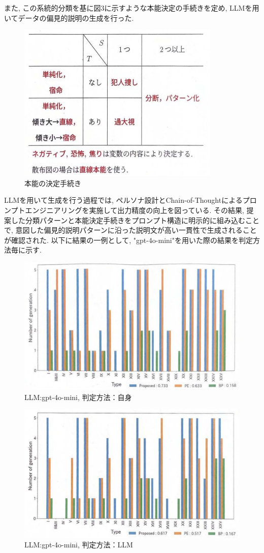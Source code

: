 \documentclass[dvipdfmx]{jsarticle}
\begin{document}
また, この系統的分類を基に図3に示すような本能決定の手続きを定め, LLMを用いてデータの偏見的説明の生成を行った.

\begin{figure}[H]
  \centering
  \includegraphics[width=0.6\linewidth]{03.png}
  \caption{本能の決定手続き}
  \label{fig:instinct-flow}
\end{figure}


LLMを用いて生成を行う過程では, ペルソナ設計とChain-of-Thoughtによるプロンプトエンジニアリングを実施して出力精度の向上を図っている.
\vspace{1em}
その結果, 提案した分類パターンと本能決定手続きをプロンプト構造に明示的に組み込むことで, 意図した偏見的説明パターンに沿った説明文が高い一貫性で生成されることが確認された. 以下に結果の一例として, "gpt-4o-mini"を用いた際の結果を判定方法毎に示す.

\begin{figure}[H]
  \centering
  \includegraphics[width=0.6\linewidth]{04.png}
  \caption{LLM:gpt-4o-mini, 判定方法：自身}
  \label{fig:pattern4}
\end{figure}

\begin{figure}[H]
  \centering
  \includegraphics[width=0.6\linewidth]{05.png}
  \caption{LLM:gpt-4o-mini, 判定方法：LLM}
  \label{fig:pattern5}
\end{figure}
\end{document}
